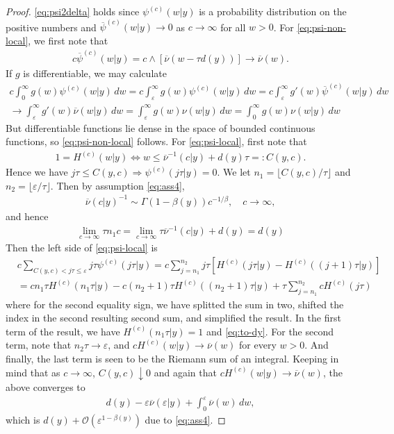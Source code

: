 \documentclass[a4paper,12pt]{elsarticle}
\numberwithin{equation}{section}
\theoremstyle{plain}
\theoremstyle{definition}
\theoremstyle{remark}
\numberwithin{equation}{section}
\newcommand{\1}{\mathbf 1}
\begin{document}
\begin{proof}
\eqref{eq:psi2delta} holds since $\psi^{(c)}(w|y)$ is a probability distribution on the positive numbers and $\overline \psi^{(c)}(w|y) \to 0$ as $c \to \infty$ for all $w > 0$.
For \eqref{eq:psi-non-local}, we first note that
\begin{align*}
c \overline \psi^{(c)}(w|y)
= c \wedge [\overline \nu(w - \tau d(y))] \to \overline \nu(w).
\end{align*}
If $g$ is differentiable, we may calculate
\begin{align*}
c \int_0^\infty g(w) \psi^{(c)}(w|y)\,dw
= c \int_\varepsilon^\infty g(w) \psi^{(c)}(w|y)\,dw
= c \int_\varepsilon^\infty g'(w) \overline \psi^{(c)}(w|y)\,dw
\\
\to \int_\varepsilon^\infty g'(w) \overline \nu(w|y)\,dw
= \int_\varepsilon^\infty g(w) \nu(w|y)\,dw
= \int_0^\infty g(w) \nu(w|y)\,dw
\end{align*}
But differentiable functions lie dense in the space of bounded continuous functions, so \eqref{eq:psi-non-local} follows.
For \eqref{eq:psi-local},
first note that
\begin{align*}
1 = H^{(c)}(w|y)
\Longleftrightarrow
w \le \overline \nu^{-1}(c|y) + d(y)\tau =: C(y,c).
\end{align*}
Hence we have $j\tau \le C(y,c) \Longrightarrow \psi^{(c)}(j\tau|y) = 0$.
We let $n_1 = \lfloor C(y,c) / \tau \rfloor$ and
$n_2 = \lfloor \varepsilon / \tau \rfloor$.
Then by assumption \eqref{eq:ass4},
\begin{align}
\overline \nu(c|y)^{-1} \sim \Gamma(1-\beta(y)) c^{-1/\beta},
\quad c \to \infty,
\end{align}
and hence
\begin{align} \label{eq:to-dy}
\lim_{c \to \infty} \tau n_1 c = \lim_{c \to \infty} \tau \overline \nu^{-1}(c | y) + d(y) = d(y)
\end{align}
Then the left side of \eqref{eq:psi-local} is
\begin{align*}
&c \sum_{C(y,c) < j\tau \le \varepsilon} j\tau \psi^{(c)}(j\tau | y)
= c \sum_{j=n_1}^{n_2} j\tau \left[ H^{(c)}(j\tau | y) - H^{(c)}((j+1)\tau | y)\right]
\\
&= c n_1 \tau H^{(c)}(n_1 \tau | y) - c (n_2+1) \tau H^{(c)}((n_2+1) \tau | y)
+ \tau \sum_{j=n_1}^{n_2} cH^{(c)}(j\tau)
\end{align*}
where for the second equality sign, we have splitted the sum in two, shifted the index in the second resulting second sum, and simplified the result.
In the first term of the result, we have $H^{(c)}(n_1 \tau | y) = 1$ and \eqref{eq:to-dy}.  For the second term, note that $n_2 \tau \to \varepsilon$, and
$c H^{(c)}(w|y) \to \overline \nu(w)$ for every $w > 0$.
And finally, the last term is seen to be the Riemann sum of an integral. Keeping in mind that as $c \to \infty$, $C(y,c) \downarrow 0$ and again that $c H^{(c)}(w|y) \to \overline \nu(w)$, the above converges to
\begin{align*}
d(y) - \varepsilon \overline \nu(\varepsilon | y)
+ \int_0^\varepsilon \overline \nu(w)\,dw,
\end{align*}
which is $d(y) + \mathcal O(\varepsilon^{1-\beta(y)})$ due to \eqref{eq:ass4}.
\end{proof}
\end{document}
